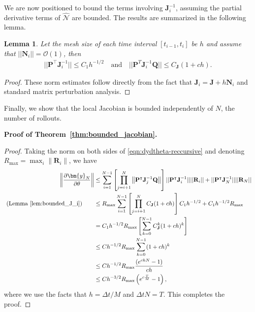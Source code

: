 \documentclass[12pt]{article}
\newtheorem{lemma}[theorem]{Lemma}
\begin{document}
We are now positioned to bound the terms involving $\mathbf{J}_i^{-1}$, assuming the partial derivative terms of $\widehat{\mathcal{N}}$ are bounded.  The results are summarized in the following lemma.
\begin{lemma} \label{lem:bounded_J_i}
Let the mesh size of each time interval $[t_{i-1}, t_i]$ be $h$ and assume that $|| \mathbf{N}_i || = \mathcal{O}(1)$, then
\begin{align*}
	|| \mathbf{P}^{\intercal} \mathbf{J}_i^{-1} || \leq C_1h^{-1/2} \quad \text{and} \quad || \mathbf{P}^T \mathbf{J}_i^{-1} \mathbf{Q} || \leq C_{\mathbf{J}}(1 + ch).
\end{align*}
\end{lemma}
\begin{proof}
These norm estimates follow directly from the fact that $\mathbf{J}_i = \mathbf{J} + h \mathbf{N}_i$ and standard matrix perturbation analysis. 	
\end{proof}

Finally, we show that the local Jacobian is bounded independently of $N$, the number of rollouts. 

\noindent\textbf{Proof of Theorem~\ref{thm:bounded_jacobian}.}
\begin{proof}
Taking the norm on both sides of \eqref{eqn:dydtheta-reccursive} and denoting $R_{\max} = \max_i \| \mathbf{R}_i \|$, we have
\begin{align*}
	\left \|	\frac{\partial \bm{y}_{N}}{\partial \theta}  \right \| & \leq   \sum_{i=1}^{N-1} \left[  \prod_{j=i+1}^N \left \| \mathbf{P}^{\intercal} \mathbf{J}_j^{-1} \mathbf{Q}  \right\| \right] || \mathbf{P}^{\intercal} \mathbf{J}_i^{-1} || || \mathbf{R}_i || +  ||\mathbf{P}^{\intercal} \mathbf{J}_N^{-1} || ||\mathbf{R}_N || \\
\text{ (Lemma \ref{lem:bounded_J_i})\qquad}	& \leq R_{\max} \sum_{i=1}^{N-1} \left[ \prod_{j=i+1}^N  C_{\mathbf{J}}(1+ch) \right]  C_1 h^{-1/2} +  C_1 h^{-1/2} R_{\max} \\
	& = C_1h^{-1/2}R_{\max} \left[ \sum_{k=0}^{N-1} C_{\mathbf{J}}^{k} (1+ch)^{k}  \right] \\
	& \leq C h^{-1/2}R_{\max} \sum_{k=0}^{N-1} (1+ch)^{k}  \\
	& \leq C h^{-1/2}R_{\max}  \frac{(e^{chN} - 1)}{ch} \\
	& \leq  C h^{-3/2} R_{\max} \left(e^{c\frac{T}{M}} - 1 \right),
\end{align*}
where we use the facts that $h = \Delta t/M$ and $\Delta t N = T$.  This completes the proof.
\end{proof}
\end{document}

